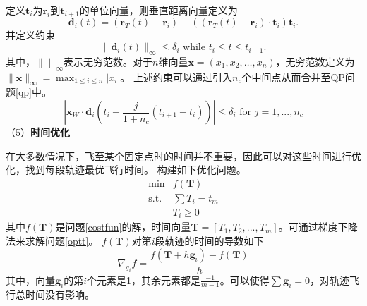 定义$\mathbf{t}_i$为$\mathbf{r}_i$到$\mathbf{t}_{i+1}$的单位向量，则垂直距离向量定义为
\begin{equation}
    \mathbf{d}_i(t)=(\mathbf{r}_T(t)-\mathbf{r}_i)-((\mathbf{r}_T(t)-\mathbf{r}_i)\cdot\mathbf{t}_i)\mathbf{t}_i.
\end{equation}
并定义约束
\begin{equation}\|\mathbf{d}_i(t)\|_\infty\leq\delta_i\text{ while }t_i\leq t\leq t_{i+1}.\end{equation}
其中，$\left\lVert \right\rVert _\infty  $表示无穷范数。对于$n$维向量$\mathbf{x}=(x_{1},x_{2},\ldots,x_{n})$，无穷范数定义为$\|\mathbf{x}\|_\infty=\max_{1\leq i\leq n}|x_i|$。
上述约束可以通过引入$n_c$个中间点从而合并至QP问题\ref{qp}中。
\begin{equation}
    \left|\mathbf{x}_W\cdot\mathbf{d}_i\left(t_i+\frac{j}{1+n_c}(t_{i+1}-t_i)\right)\right|\leq\delta_i\text{ for }j=1,...,n_c
\end{equation}
（5）\textbf{时间优化}


在大多数情况下，飞至某个固定点时的时间并不重要，因此可以对这些时间进行优化，找到每段轨迹最优飞行时间。
构建如下优化问题。
\begin{equation}\label{optt}
    \begin{aligned}\min&f(\mathbf{T})\\\mathrm{s.t.}&\sum T_i=t_m\\&T_i\geq0\end{aligned}
\end{equation}
其中$f(\mathbf{T})$是问题\ref{costfun}的解，时间向量$\textbf{T}= [T_1,T_2,...,T_m]$。可通过梯度下降法来求解问题\ref{optt}。
$f(\mathbf{T})$对第$i$段轨迹的时间的导数如下
\begin{equation}
    \nabla_{g_i}f=\frac{f(\mathbf{T}+h\mathbf{g}_i)-f(\mathbf{T})}h
\end{equation}
其中，向量$\mathbf{g}_i$的第$i$个元素是1，其余元素都是$\frac{-1}{m-1}$。可以使得$\sum\mathbf{g}_i=0$，对轨迹飞行总时间没有影响。

